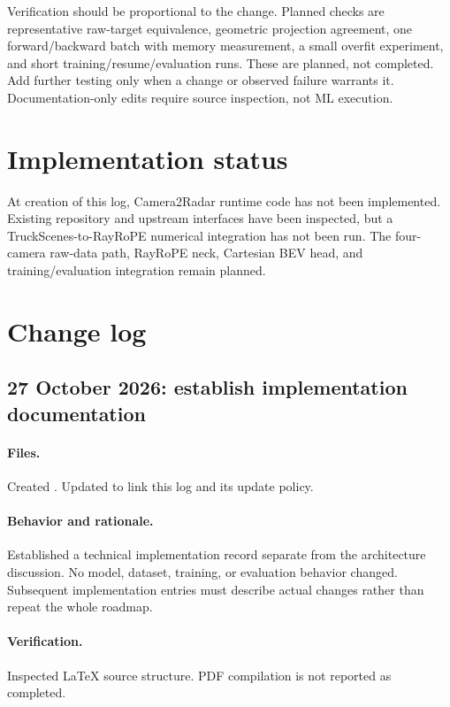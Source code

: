 \documentclass[11pt,a4paper]{article}
\begin{document}
Verification should be proportional to the change. Planned checks are representative raw-target equivalence, geometric projection agreement, one forward/backward batch with memory measurement, a small overfit experiment, and short training/resume/evaluation runs. These are planned, not completed. Add further testing only when a change or observed failure warrants it. Documentation-only edits require source inspection, not ML execution.

\section{Implementation status}
At creation of this log, Camera2Radar runtime code has not been implemented. Existing repository and upstream interfaces have been inspected, but a TruckScenes-to-RayRoPE numerical integration has not been run. The four-camera raw-data path, RayRoPE neck, Cartesian BEV head, and training/evaluation integration remain planned.

\section{Change log}
\subsection{27 October 2026: establish implementation documentation}
\paragraph{Files.}
Created . Updated  to link this log and its update policy.

\paragraph{Behavior and rationale.}
Established a technical implementation record separate from the architecture discussion. No model, dataset, training, or evaluation behavior changed. Subsequent implementation entries must describe actual changes rather than repeat the whole roadmap.

\paragraph{Verification.}
Inspected LaTeX source structure. PDF compilation is not reported as completed.
\end{document}
